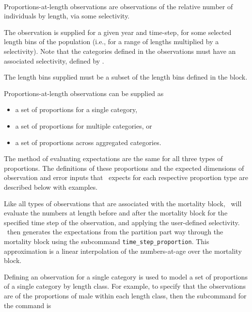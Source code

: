 \else

\paragraph*{}\label{sec:Observation-ProportionsAtLength}

Proportions-at-length observations are observations of the relative number of individuals by length, via some selectivity.

The observation is supplied for a given year and time-step, for some selected length bins of the population (i.e., for a range of lengths multiplied by a selectivity). Note that the categories defined in the observations must have an associated selectivity, defined by .

The length bins supplied must be a subset of the length bins defined in the  block. 

Proportions-at-length observations can be supplied as

\begin{itemize}
	\item a set of proportions for a single category,
	\item a set of proportions for multiple categories, or
	\item a set of proportions across aggregated categories.
\end{itemize}

The method of evaluating expectations are the same for all three types of proportions. The definitions of these proportions and the expected dimensions of observation and error inputs that \CNAME\ expects for each respective proportion type are described below with examples.

Like all types of observations that are associated with the mortality block, \CNAME\ will evaluate the numbers at length before and after the mortality block for the specified time step of the observation, and applying the user-defined selectivity. \CNAME\ then generates the expectations from the partition part way through the mortality block using the subcommand \texttt{time\_step\_proportion}. This approximation is a linear interpolation of the numbers-at-age over the mortality block.

Defining an observation for a single category is used to model a set of proportions of a single category by length class. For example, to specify that the observations are of the proportions of male within each length class, then the subcommand  for the  command is

